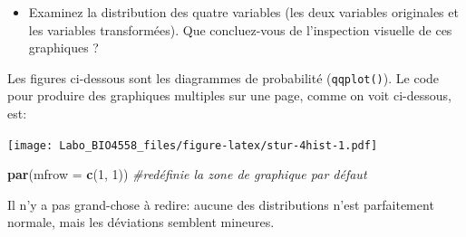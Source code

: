 \documentclass[12pt,]{book}
\newenvironment{Shaded}{\begin{snugshade}}{\end{snugshade}}
\newcommand{\CommentTok}[1]{\textcolor[rgb]{0.56,0.35,0.01}{\textit{#1}}}
\newcommand{\DataTypeTok}[1]{\textcolor[rgb]{0.13,0.29,0.53}{#1}}
\newcommand{\DecValTok}[1]{\textcolor[rgb]{0.00,0.00,0.81}{#1}}
\newcommand{\KeywordTok}[1]{\textcolor[rgb]{0.13,0.29,0.53}{\textbf{#1}}}
\newcommand{\NormalTok}[1]{#1}
\newcommand{\OperatorTok}[1]{\textcolor[rgb]{0.81,0.36,0.00}{\textbf{#1}}}
\newcommand{\StringTok}[1]{\textcolor[rgb]{0.31,0.60,0.02}{#1}}
\providecommand{\tightlist}{%
  \setlength{\itemsep}{0pt}\setlength{\parskip}{0pt}}
\begin{document}
\begin{itemize}
\tightlist
\item
  Examinez la distribution des quatre variables (les deux variables originales et les variables transformées). Que concluez-vous de l'inspection visuelle de ces graphiques ?
\end{itemize}

Les figures ci-dessous sont les diagrammes de probabilité (\texttt{qqplot()}).
Le code pour produire des graphiques multiples sur une page, comme
on voit ci-dessous, est:

\begin{Shaded}
\end{Shaded}

\texttt{[image: Labo\_BIO4558\_files/figure-latex/stur-4hist-1.pdf]}

\begin{Shaded}
\begin{Highlighting}[]
\KeywordTok{par}\NormalTok{(}\DataTypeTok{mfrow =} \KeywordTok{c}\NormalTok{(}\DecValTok{1}\NormalTok{, }\DecValTok{1}\NormalTok{)) }\CommentTok{#redéfinie la zone de graphique par défaut}
\end{Highlighting}
\end{Shaded}

Il n'y a pas grand-chose à redire: aucune des distributions n'est
parfaitement normale, mais les déviations semblent mineures.
\end{document}
